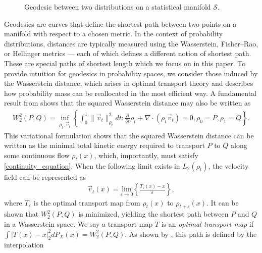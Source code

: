 \documentclass[11pt,twoside]{article}
\theoremstyle{definition}
\theoremstyle{remark}
\begin{document}
\begin{figure}[h]
    \caption{Geodesic between two distributions on a statistical manifold $\mathcal{S}$.}
    \label{fig:enter-label}
\end{figure}




Geodesics are curves that define the shortest path between two points on a manifold with respect to a chosen metric. In the context of probability distributions, distances are typically measured using the Wasserstein, Fisher--Rao, or Hellinger metrics --- each of which defines a different notion of shortest path. These are special paths of shortest length which we focus on in this paper. To provide intuition for geodesics in probability spaces, we consider those induced by the Wasserstein distance, which arises in optimal transport theory and describes how probability mass can be reallocated in the most efficient way. A fundamental result from \cite{benamou2000computational} shows that the squared Wasserstein distance may also be written as
\begin{align*}
W^2_2(P, Q) = \inf_{\rho_t,\vec v_t} \left\{ \int^1_0 \|\vec{v}_t\|^2_{\rho_t} dt : 
\frac{\partial}{\partial t} \rho_t + \nabla \cdot (\rho_t \vec{v}_t) = 0,  \rho_0 = P, \rho_1 = Q\right\}.
\end{align*}
This variational formulation shows that the squared Wasserstein distance can be written as the minimal total kinetic energy required to transport $P$ to $Q$ along some continuous flow $\rho_t(x)$, which, importantly, must satisfy \cref{continuity_equation}. When the following limit exists in $L_2(\rho_t)$, the velocity field can be represented as
\begin{align*}
\vec{v}_t(x) = \underset{\varepsilon \to 0}{\text{lim}} \left\{ \frac{T_\varepsilon(x) - x}{\varepsilon} \right\},
\end{align*}
where $T_\varepsilon$ is the optimal transport map from $\rho_t(x)$ to $\rho_{t + \varepsilon}(x)$. It can be shown that $W^2_2(P, Q)$ is minimized, yielding the shortest path between $P$ and $Q$ in a Wasserstein space. We say a transport map $T$ is an \emph{optimal transport map} if $\int |T(x)-x|^2_2 dP_X(x) = W_2^2(P,Q)$. As shown by \cite{mccann1997convexity}, this path is defined by the interpolation
\end{document}
